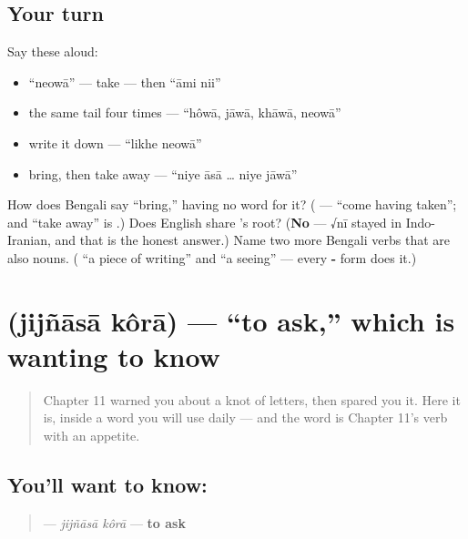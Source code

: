 \subsection*{Your turn}
Say these aloud:

\begin{itemize}
\raggedright
  \item \textquotedblleft{}neowā\textquotedblright{} — take — then \textquotedblleft{}āmi nii\textquotedblright{}
  \item the same tail four times — \textquotedblleft{}hôwā, jāwā, khāwā, neowā\textquotedblright{}
  \item write it down — \textquotedblleft{}likhe neowā\textquotedblright{}
  \item bring, then take away — \textquotedblleft{}niye āsā … niye jāwā\textquotedblright{}
\end{itemize}

\begin{tcolorbox}[breakable,colback=teal!4,colframe=teal!35!black,title={Before you move on}]
How does Bengali say \textquotedblleft{}bring,\textquotedblright{} having no word for it? (\textbf{ } — \textquotedblleft{}come having taken\textquotedblright{}; and \textquotedblleft{}take away\textquotedblright{} is  .) Does English share 's root? (\textbf{No} — √nī stayed in Indo-Iranian, and that is the honest answer.) Name two more Bengali verbs that are also nouns. (\textbf{} \textquotedblleft{}a piece of writing\textquotedblright{} and \textbf{} \textquotedblleft{}a seeing\textquotedblright{} — every \textbf{-} form does it.)
\end{tcolorbox}
\section[jijñāsā kôrā]{  (jijñāsā kôrā) — \textquotedblleft{}to ask,\textquotedblright{} which is wanting to know}

\label{lesson:BN-C09-jijnasa-kora}



\begin{quote}
Chapter 11 warned you about a knot of letters, then spared you it. Here it is, inside a word you will use daily — and the word is Chapter 11's verb with an appetite.
\end{quote}

\subsection*{You'll want to know:  }
\begin{quote}
\textbf{ } — \emph{jijñāsā kôrā} — \textbf{to ask}
\end{quote}

